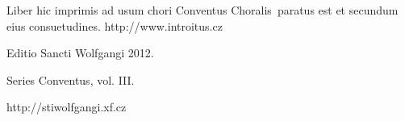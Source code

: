 \documentclass[a4paper, twoside, 12pt]{article}
\begin{document}
\begin{center}
Liber hic imprimis ad usum chori 
\guillemotright Conventus Choralis\guillemotleft\ 
paratus est
et secundum eius consuetudines.
http://www.introitus.cz

\vspace{1cm}

{\large Editio Sancti Wolfgangi 2012.}

\vspace{2mm}

Series \guillemotright Conventus\guillemotleft, vol. III.

\vspace{1cm}

http://stiwolfgangi.xf.cz

\end{center}

\vfill
\end{document}
